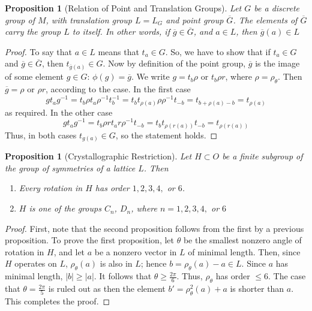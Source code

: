 \documentclass[12pt]{article}
\newtheorem{prop}[thm]{Proposition}
\theoremstyle{definition}
\theoremstyle{remark}
\numberwithin{equation}{section}
\begin{document}
\vspace{15pt}

\begin{prop}[Relation of Point and Translation Groups]
        Let $G$ be a discrete group of $M$, with translation group $L = L_G$ and point group $\overline{G}$. The elements of $\overline{G}$ carry the group $L$ to itself. In other words, if $\overline{g} \in \overline{G}$, and $a\in L$, then $\overline{g}(a) \in L$
\end{prop}

\begin{proof}
        To say that $a \in L$ means that $t_a \in G$. So, we have to show that if $t_a \in G$ and $\overline{g} \in \overline{G}$, then $t_{\overline{g}(a)} \in G$. Now by definition of the point group, $\overline{g}$ is the image of some element $g \in G$: $\phi(g) = \overline{g}$. We write $g = t_b\rho$ or $t_b\rho r$, where $\rho = \rho_{\theta}$. Then $\overline{g} = \rho$ or $\rho r$, according to the case. In the first case \begin{equation}
                gt_ag^{-1} = t_b\rho t_a \rho^{-1}t_b^{-1} = t_bt_{\rho(a)}\rho\rho^{-1}t_{-b} = t_{b+\rho(a)-b} = t_{\rho(a)} 
        \end{equation}
        as required. In the other case \begin{equation}
                gt_ag^{-1} = t_b\rho r t_a r \rho^{-1}t_{-b} = t_bt_{\rho(r(a))}t_{-b} = t_{\rho(r(a))}
        \end{equation}
        Thus, in both cases $t_{g(a)} \in G$, so the statement holds.
\end{proof}

\vspace{15pt}

\begin{prop}[Crystallographic Restriction]
        Let $H \subset O$ be a finite subgroup of the group of symmetries of a lattice $L$. Then \begin{enumerate}
                \item Every rotation in $H$ has order $1,2,3,4,$ or $6$.
                \item $H$ is one of the groups $C_n$, $D_n$, where $n=1,2,3,4,$ or $6$
        \end{enumerate}
\end{prop}
\begin{proof}
        First, note that the second proposition follows from the first by a previous proposition. To prove the first proposition, let $\theta$ be the smallest nonzero angle of rotation in $H$, and let $a$ be a nonzero vector in $L$ of minimal length. Then, since $H$ operates on $L$, $\rho_{\theta}(a)$ is also in $L$; hence $b = \rho_{\theta}(a) - a \in L$. Since $a$ has minimal length, $|b| \geq |a|$. It follows that $\theta \geq \frac{2\pi}{6}$. Thus, $\rho_{\theta}$ has order $\leq 6$. The case that $\theta = \frac{2\pi}{5}$ is ruled out as then the element $b' = \rho_{\theta}^2(a)+a$ is shorter than $a$. This completes the proof.
\end{proof}
\end{document}
